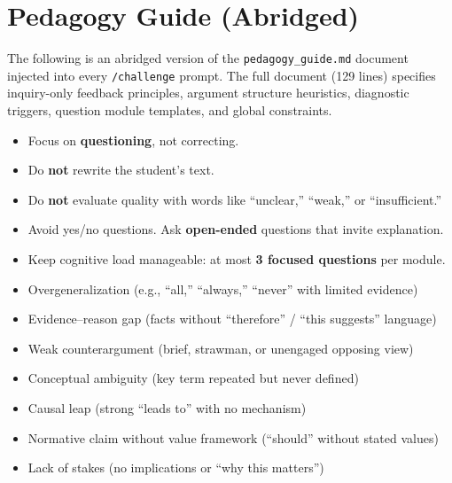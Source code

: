 \documentclass[11pt,a4paper]{article}
\begin{document}
\appendix
\section{Pedagogy Guide (Abridged)}
\label{app:pedagogy}

The following is an abridged version of the \texttt{pedagogy\_guide.md} document injected into every \texttt{/challenge} prompt. The full document (129 lines) specifies inquiry-only feedback principles, argument structure heuristics, diagnostic triggers, question module templates, and global constraints.

\begin{tcolorbox}[colback=gray!5, colframe=gray!50, title=Inquiry-Only Feedback Principles]
\small
\begin{itemize}[leftmargin=*,noitemsep]
    \item Focus on \textbf{questioning}, not correcting.
    \item Do \textbf{not} rewrite the student's text.
    \item Do \textbf{not} evaluate quality with words like ``unclear,'' ``weak,'' or ``insufficient.''
    \item Avoid yes/no questions. Ask \textbf{open-ended} questions that invite explanation.
    \item Keep cognitive load manageable: at most \textbf{3 focused questions} per module.
\end{itemize}
\end{tcolorbox}

\begin{tcolorbox}[colback=gray!5, colframe=gray!50, title=Diagnostic Triggers (Internal Only)]
\small
\begin{itemize}[leftmargin=*,noitemsep]
    \item Overgeneralization (e.g., ``all,'' ``always,'' ``never'' with limited evidence)
    \item Evidence--reason gap (facts without ``therefore'' / ``this suggests'' language)
    \item Weak counterargument (brief, strawman, or unengaged opposing view)
    \item Conceptual ambiguity (key term repeated but never defined)
    \item Causal leap (strong ``leads to'' with no mechanism)
    \item Normative claim without value framework (``should'' without stated values)
    \item Lack of stakes (no implications or ``why this matters'')
\end{itemize}
\end{tcolorbox}
\end{document}
